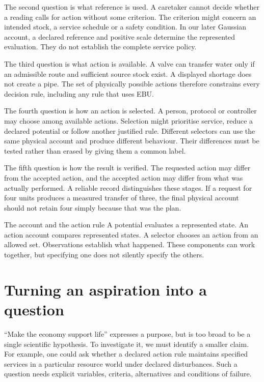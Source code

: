 The second question is what reference is used. A caretaker cannot decide whether a reading calls for action without some criterion. The criterion might concern an intended stock, a service schedule or a safety condition. In our later Gaussian account, a declared reference and positive scale determine the represented evaluation. They do not establish the complete service policy.

The third question is what action is available. A valve can transfer water only if an admissible route and sufficient source stock exist. A displayed shortage does not create a pipe. The set of physically possible actions therefore constrains every decision rule, including any rule that uses EBU.

The fourth question is how an action is selected. A person, protocol or controller may choose among available actions. Selection might prioritise service, reduce a declared potential or follow another justified rule. Different selectors can use the same physical account and produce different behaviour. Their differences must be tested rather than erased by giving them a common label.

The fifth question is how the result is verified. The requested action may differ from the accepted action, and the accepted action may differ from what was actually performed. A reliable record distinguishes these stages. If a request for four units produces a measured transfer of three, the final physical account should not retain four simply because that was the plan.

\begin{intuitionbox}{The account and the action rule}
A potential evaluates a represented state. An action account compares represented states. A selector chooses an action from an allowed set. Observations establish what happened. These components can work together, but specifying one does not silently specify the others.
\end{intuitionbox}

\section{Turning an aspiration into a question}
``Make the economy support life'' expresses a purpose, but is too broad to be a single scientific hypothesis. To investigate it, we must identify a smaller claim. For example, one could ask whether a declared action rule maintains specified services in a particular resource world under declared disturbances. Such a question needs explicit variables, criteria, alternatives and conditions of failure.

